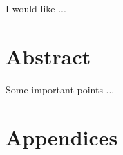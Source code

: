 \documentclass[12pt]{report}
\renewcommand{\(}{\left(}
\renewcommand{\)}{\right)}
\renewcommand{\[}{\left[}
\renewcommand{\]}{\right]}
\begin{document}
I would like ...
  
\newpage  

\chapter*{Abstract}  

\vspace{3mm}

Some important points ...

\newpage

\tableofcontents



\newpage




%

%









\chapter*{Appendices}  

\appendix





%




%


%
\end{document}
